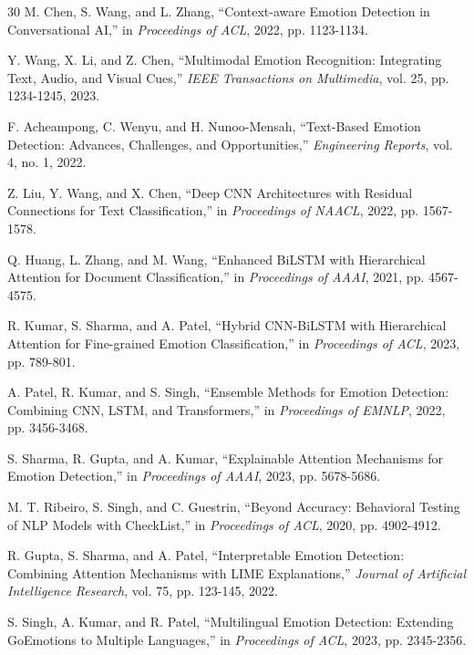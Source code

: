 \documentclass[12pt,a4paper]{article}
\begin{document}
\begin{thebibliography}{30}
M. Chen, S. Wang, and L. Zhang, ``Context-aware Emotion Detection in Conversational AI,'' in \textit{Proceedings of ACL}, 2022, pp. 1123-1134.

Y. Wang, X. Li, and Z. Chen, ``Multimodal Emotion Recognition: Integrating Text, Audio, and Visual Cues,'' \textit{IEEE Transactions on Multimedia}, vol. 25, pp. 1234-1245, 2023.

F. Acheampong, C. Wenyu, and H. Nunoo-Mensah, ``Text-Based Emotion Detection: Advances, Challenges, and Opportunities,'' \textit{Engineering Reports}, vol. 4, no. 1, 2022.

Z. Liu, Y. Wang, and X. Chen, ``Deep CNN Architectures with Residual Connections for Text Classification,'' in \textit{Proceedings of NAACL}, 2022, pp. 1567-1578.

Q. Huang, L. Zhang, and M. Wang, ``Enhanced BiLSTM with Hierarchical Attention for Document Classification,'' in \textit{Proceedings of AAAI}, 2021, pp. 4567-4575.

R. Kumar, S. Sharma, and A. Patel, ``Hybrid CNN-BiLSTM with Hierarchical Attention for Fine-grained Emotion Classification,'' in \textit{Proceedings of ACL}, 2023, pp. 789-801.

A. Patel, R. Kumar, and S. Singh, ``Ensemble Methods for Emotion Detection: Combining CNN, LSTM, and Transformers,'' in \textit{Proceedings of EMNLP}, 2022, pp. 3456-3468.

S. Sharma, R. Gupta, and A. Kumar, ``Explainable Attention Mechanisms for Emotion Detection,'' in \textit{Proceedings of AAAI}, 2023, pp. 5678-5686.

M. T. Ribeiro, S. Singh, and C. Guestrin, ``Beyond Accuracy: Behavioral Testing of NLP Models with CheckList,'' in \textit{Proceedings of ACL}, 2020, pp. 4902-4912.

R. Gupta, S. Sharma, and A. Patel, ``Interpretable Emotion Detection: Combining Attention Mechanisms with LIME Explanations,'' \textit{Journal of Artificial Intelligence Research}, vol. 75, pp. 123-145, 2022.

S. Singh, A. Kumar, and R. Patel, ``Multilingual Emotion Detection: Extending GoEmotions to Multiple Languages,'' in \textit{Proceedings of ACL}, 2023, pp. 2345-2356.


\end{thebibliography}
\end{document}
